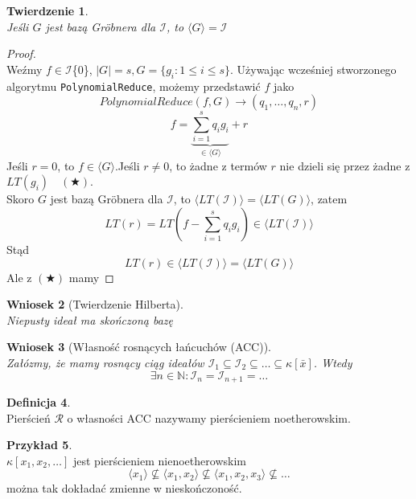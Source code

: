 \documentclass[11pt,a4paper]{article}
\newtheorem{twierdzenie}{Twierdzenie}[section]
\newtheorem{wniosek}[twierdzenie]{Wniosek}
\theoremstyle{definition}
\newtheorem{definicja}[twierdzenie]{Definicja}
\newtheorem{przyklad}[twierdzenie]{Przykład}
\theoremstyle{remark}
\begin{document}
\begin{twierdzenie}~\\
    Jeśli $G$ jest bazą Gröbnera dla $\mathcal{I}$, to $\langle G \rangle = \mathcal{I}$
\end{twierdzenie}
\begin{proof}~\\
    Weźmy $f \in \mathcal{I}$\setmius \{0\}, $|G| = s, G=\{g_i: 1\leq i \leq s\}$. Używając wcześniej stworzonego algorytmu \texttt{PolynomialReduce}, możemy przedstawić $f$ jako
    \[
        PolynomialReduce(f, G) \rightarrow (q_1, \dots, q_n, r)
    \]
    \[
        f = \underbrace{\sum_{i=1}^s q_i g_i}_{\in \langle G \rangle} + r
    \]
    Jeśli $r = 0$, to $f \in \langle G \rangle$.Jeśli $r \neq 0$, to żadne z termów $r$ nie dzieli się przez żadne z $LT(g_i) \quad (\bigstar)$.\\
    Skoro $G$ jest bazą Gröbnera dla $\mathcal{I}$, to $\langle LT(\mathcal{I}) \rangle = \langle LT(G) \rangle$, zatem 
    \[
        LT(r) = LT(f-\sum_{i=1}^s q_i g_i) \in \langle LT(\mathcal{I}) \rangle
    \]
    Stąd 
    \[
        LT(r) \in \langle LT(\mathcal{I}) \rangle = \langle LT(G) \rangle
    \]
    Ale z $(\bigstar)$ mamy \Rightarrow\!\Leftarrow
\end{proof}
\begin{wniosek}[Twierdzenie Hilberta]~\\
    Niepusty ideał ma skończoną bazę
\end{wniosek}
\begin{wniosek}[Własność rosnących łańcuchów (ACC)]~\\
    Załózmy, że mamy rosnący ciąg ideałów $\mathcal{I}_1 \subseteq \mathcal{I}_2 \subseteq \dots \subseteq \kappa[\bar{x}]$. Wtedy 
    \[
        \exists n \in \mathbb{N}: \mathcal{I}_n = \mathcal{I}_{n+1} = \dots
    \]
\end{wniosek}
\begin{definicja}~\\
    Pierścień $\mathcal{R}$ o własności ACC nazywamy pierścieniem noetherowskim.
\end{definicja}
\begin{przyklad}~\\
    $\kappa[x_1, x_2, \dots]$ jest pierścieniem nienoetherowskim
    \[
    \langle x_1 \rangle \nsubseteq \langle x_1, x_2 \rangle \nsubseteq \langle x_1, x_2, x_3 \rangle \nsubseteq \dots
\] można tak dokładać zmienne w nieskończoność.
\end{przyklad}
\end{document}

